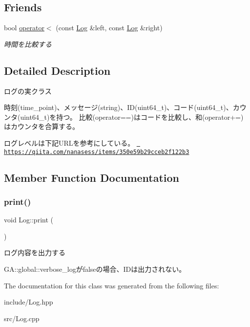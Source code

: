 \subsection*{Friends}
\begin{DoxyCompactItemize}
\item 
\mbox{\label{class_log_ac87f1df3bb29665505760bcc34cac4de}} 
bool \mbox{\hyperlink{class_log_ac87f1df3bb29665505760bcc34cac4de}{operator$<$}} (const \mbox{\hyperlink{class_log}{Log}} \&left, const \mbox{\hyperlink{class_log}{Log}} \&right)
\begin{DoxyCompactList}\small\item\em 時間を比較する \end{DoxyCompactList}\end{DoxyCompactItemize}


\subsection{Detailed Description}
ログの実クラス 

時刻(time\+\_\+point)、メッセージ(string)、\+I\+D(uint64\+\_\+t)、コード(uint64\+\_\+t)、カウンタ(uint64\+\_\+t)を持つ。 比較(operator==)はコードを比較し、和(operator+=)はカウンタを合算する。

ログレベルは下記\+U\+R\+Lを参考にしている。 \href{https://qiita.com/nanasess/items/350e59b29cceb2f122b3}{\texttt{ https\+://qiita.\+com/nanasess/items/350e59b29cceb2f122b3}} 

\subsection{Member Function Documentation}
\mbox{\label{class_log_ac765b7cc014cf47218adb2fd5f48a13f}} 
\subsubsection{\texorpdfstring{print()}{print()}}
{\footnotesize\ttfamily void Log\+::print (\begin{DoxyParamCaption}{ }\end{DoxyParamCaption})}



ログ内容を出力する 

G\+A\+::global\+::verbose\+\_\+logがfalseの場合、\+I\+Dは出力されない。 

The documentation for this class was generated from the following files\+:\begin{DoxyCompactItemize}
\item 
include/Log.\+hpp\item 
src/Log.\+cpp\end{DoxyCompactItemize}
